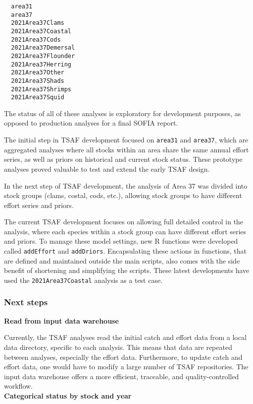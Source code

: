 \documentclass[12pt]{article}
\begin{document}
\begin{verbatim}
  area31
  area37
  2021Area37Clams
  2021Area37Coastal
  2021Area37Cods
  2021Area37Demersal
  2021Area37Flounder
  2021Area37Herring
  2021Area37Other
  2021Area37Shads
  2021Area37Shrimps
  2021Area37Squid
\end{verbatim}

The status of all of these analyses is exploratory for development purposes, as
opposed to production analyses for a final SOFIA report.

The initial step in TSAF development focused on \verb|area31| and \verb|area37|,
which are aggregated analyses where all stocks within an area share the same
annual effort series, as well as priors on historical and current stock status.
These prototype analyses proved valuable to test and extend the early TSAF
design.

In the next step of TSAF development, the analysis of Area 37 was divided into
stock groups (clams, costal, cods, etc.), allowing stock groups to have
different effort series and priors.

The current TSAF development focuses on allowing full detailed control in the
analysis, where each species within a stock group can have different effort
series and priors. To manage these model settings, new R functions were
developed called \verb|addEffort| and \verb|addDriors|. Encapsulating these
actions in functions, that are defined and maintained outside the main scripts,
also comes with the side benefit of shortening and simplifying the scripts.
These latest developments have used the \verb|2021Area37Coastal| analysis as a
test case.

\subsubsection{Next steps}
\label{subsubsec:repos-next-steps}

\textbf{Read from input data warehouse}

Currently, the TSAF analyses read the initial catch and effort data from a local
data directory, specific to each analysis. This means that data are repeated
between analyses, especially the effort data. Furthermore, to update catch and
effort data, one would have to modify a large number of TSAF repositories. The
input data warehouse offers a more efficient, traceable, and quality-controlled
workflow.\\[-2ex]

\textbf{Categorical status by stock and year}
\end{document}

